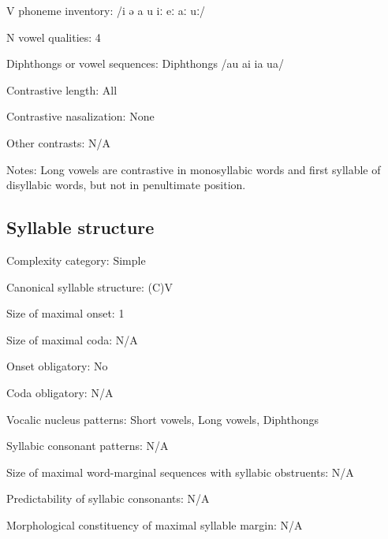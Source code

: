 {\begin{appendixdesc}
\item[V phoneme inventory:] /i ə a u iː eː aː uː/

\item[N vowel qualities:] 4

\item[Diphthongs or vowel sequences:] Diphthongs /au ai ia ua/

\item[Contrastive length:] All

\item[Contrastive nasalization:] None

\item[Other contrasts:] N/A

\item[Notes:] Long vowels are contrastive in monosyllabic words and first syllable of disyllabic words, but not in penultimate position.
\end{appendixdesc}
\subsection*{Syllable structure}
\begin{appendixdesc}

\item[Complexity category:] Simple

\item[Canonical syllable structure:] (C)V \citep[211--218]{Chen2006}

\item[Size of maximal onset:] 1

\item[Size of maximal coda:] N/A

\item[Onset obligatory:] No

\item[Coda obligatory:] N/A

\item[Vocalic nucleus patterns:] Short vowels, Long vowels, Diphthongs

\item[Syllabic consonant patterns:] N/A

\item[Size of maximal word-marginal sequences with syllabic obstruents:] N/A

\item[Predictability of syllabic consonants:] N/A

\item[Morphological constituency of maximal syllable margin:] N/A


\end{appendixdesc}}
